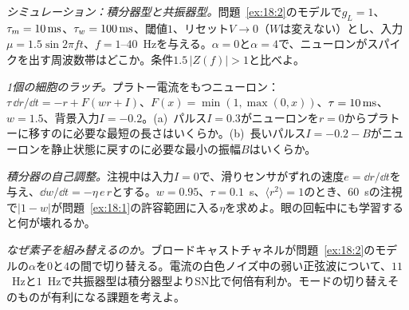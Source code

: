 \begin{exercise}[\lvlB]
\label{ex:18:4}
\emph{シミュレーション：積分器型と共振器型。}問題~\ref{ex:18:2}のモデルで$g_L=1$、$\tau_m=10\,\text{ms}$、$\tau_w=100\,\text{ms}$、閾値$1$、リセット$V\to0$（$W$は変えない）とし、入力$\mu=1.5\sin2\pi ft$、$f=1$--$40$~Hzを与える。$\alpha=0$と$\alpha=4$で、ニューロンがスパイクを出す周波数帯はどこか。条件$1.5\,|Z(f)|>1$と比べよ。
\end{exercise}

\begin{exercise}[\lvlB]
\label{ex:18:5}
\emph{1個の細胞のラッチ。}プラトー電流をもつニューロン：$\tau\,\dd r/\dd t=-r+F(wr+I)$、$F(x)=\min(1,\max(0,x))$、$\tau=10\,\text{ms}$、$w=1.5$、背景入力$I=-0.2$。(a)~パルス$I=0.3$がニューロンを$r=0$からプラトーに移すのに必要な最短の長さはいくらか。(b)~長いパルス$I=-0.2-B$がニューロンを静止状態に戻すのに必要な最小の振幅$B$はいくらか。
\end{exercise}

\begin{exercise}[\lvlB]
\label{ex:18:6}
\emph{積分器の自己調整。}注視中は入力$I=0$で、滑りセンサがずれの速度$e=\dd r/\dd t$を与え、$\dd w/\dd t=-\eta\,e\,r$とする。$w=0.95$、$\tau=0.1$~s、$\langle r^2\rangle=1$のとき、$60$~sの注視で$|1-w|$が問題~\ref{ex:18:1}の許容範囲に入る$\eta$を求めよ。眼の回転中にも学習すると何が壊れるか。
\end{exercise}

\begin{exercise}[\lvlC]
\label{ex:18:7}
\emph{なぜ素子を組み替えるのか。}ブロードキャストチャネルが問題~\ref{ex:18:2}のモデルの$\alpha$を$0$と$4$の間で切り替える。電流の白色ノイズ中の弱い正弦波について、$11$~Hzと$1$~Hzで共振器型は積分器型よりSN比で何倍有利か。モードの切り替えそのものが有利になる課題を考えよ。
\end{exercise}
